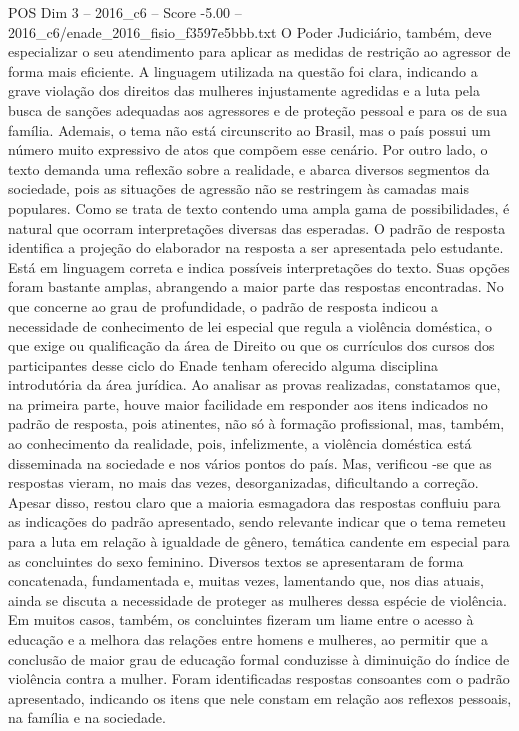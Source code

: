 \begin{textsample}{POS Dim 3 – 2016\_c6 – Score -5.00 – 2016\_c6/enade\_2016\_fisio\_f3597e5bbb.txt}
O Poder Judiciário, também, deve especializar o seu atendimento para aplicar as medidas de restrição ao agressor de forma mais eficiente.
A linguagem utilizada na questão foi clara, indicando a grave violação dos direitos das mulheres injustamente agredidas e a luta pela busca de sanções adequadas aos agressores e de proteção pessoal e para os de sua família.
Ademais, o tema não está circunscrito ao Brasil, mas o país possui um número muito expressivo de atos que compõem esse cenário.
Por outro lado, o texto demanda uma reflexão sobre a realidade, e abarca diversos segmentos da sociedade, pois as situações de agressão não se restringem às camadas mais populares.
Como se trata de texto contendo uma ampla gama de possibilidades, é natural que ocorram interpretações diversas das esperadas.
O padrão de resposta identifica a projeção do elaborador na resposta a ser apresentada pelo estudante.
Está em linguagem correta e indica possíveis interpretações do texto.
Suas opções foram bastante amplas, abrangendo a maior parte das respostas encontradas.
No que concerne ao grau de profundidade, o padrão de resposta indicou a necessidade de conhecimento de lei especial que regula a violência doméstica, o que exige ou qualificação da área de Direito ou que os currículos dos cursos dos participantes desse ciclo do Enade tenham oferecido alguma disciplina introdutória da área jurídica.
Ao analisar as provas realizadas, constatamos que, na primeira parte, houve maior facilidade em responder aos itens indicados no padrão de resposta, pois atinentes, não só à formação profissional, mas, também, ao conhecimento da realidade, pois, infelizmente, a violência doméstica está disseminada na sociedade e nos vários pontos do país.
Mas, verificou -se que as respostas vieram, no mais das vezes, desorganizadas, dificultando a correção.
Apesar disso, restou claro que a maioria esmagadora das respostas confluiu para as indicações do padrão apresentado, sendo relevante indicar que o tema remeteu para a luta em relação à igualdade de gênero, temática candente em especial para as concluintes do sexo feminino.
Diversos textos se apresentaram de forma concatenada, fundamentada e, muitas vezes, lamentando que, nos dias atuais, ainda se discuta a necessidade de proteger as mulheres dessa espécie de violência.
Em muitos casos, também, os concluintes fizeram um liame entre o acesso à educação e a melhora das relações entre homens e mulheres, ao permitir que a conclusão de maior grau de educação formal conduzisse à diminuição do índice de violência contra a mulher.
Foram identificadas respostas consoantes com o padrão apresentado, indicando os itens que nele constam em relação aos reflexos pessoais, na família e na sociedade.

\end{textsample}
